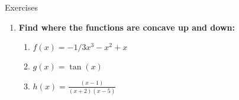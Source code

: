 \documentclass[../revisedmain.tex]{subfiles}
\begin{document}
\begin{center}
	{\Large Exercises}
\end{center}
\begin{enumerate}
	\item \textbf{Find where the functions are concave up and down:}
	\begin{enumerate}
		\item $f(x)=-1/3x^3-x^2+x$
		\item $g(x)=\tan(x)$
		\item $h(x)=\displaystyle\frac{(x-1)}{(x+2)(x-5)}$
	\end{enumerate}
\end{enumerate}
\end{document}
